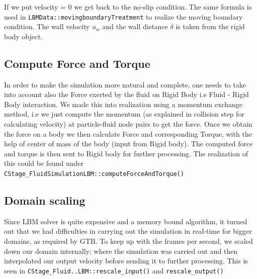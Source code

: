 If we put velocity = 0 we get back to the no-slip condition. The same formula is used in \texttt{LBMData::movingboundaryTreatment}  to realize the
moving boundary condition. The wall velocity $u_w$ and the wall distance $\delta$ 
is taken from the rigid body object.

\subsection *{Compute Force and Torque}
In order to make the simulation more natural and complete, one needs to take into account also the Force exerted by the fluid on Rigid Body i.e Fluid - Rigid Body interaction. We made this into realization using a momentum exchange method, i.e we just compute the momentum (as explained in collision step for calculating velocity) at particle-fluid node pairs to get the force.
Once we obtain the force on a body we then calculate Force and corresponding Torque, with the help of center of mass of the body (input from Rigid body). The computed force and torque is then sent to Rigid body for further processing.
The realization of this could be found under \texttt{CStage_FluidSimulationLBM::computeForceAndTorque()}

\subsection{Domain scaling}
Since LBM solver is quite expensive and a memory bound algorithm, it turned out that
we had difficulties in carrying out the simulation in real-time for bigger domains, as required by GTB. To keep up with the frames per second, we scaled down our domain internally; where the simulation was carried out and then interpolated our output velocity before sending it to further processing. This is seen in \texttt{CStage_Fluid..LBM::rescale_input()} and \texttt{rescale_output()}



